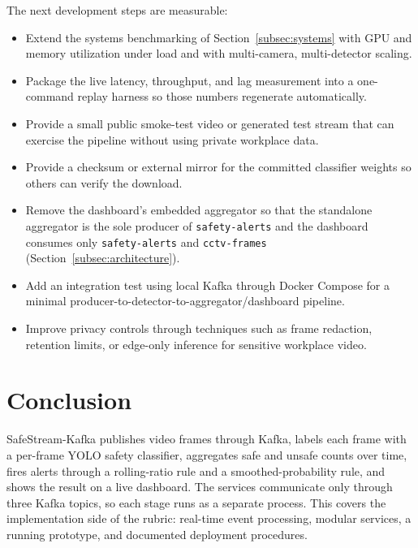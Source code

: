 \documentclass[conference]{IEEEtran}
\begin{document}
The next development steps are measurable:

\begin{itemize}
    \item Extend the systems benchmarking of Section~\ref{subsec:systems} with
    GPU and memory utilization under load and with multi-camera, multi-detector
    scaling.

    \item Package the live latency, throughput, and lag measurement into a
    one-command replay harness so those numbers regenerate automatically.

    \item Provide a small public smoke-test video or generated test
    stream that can exercise the pipeline without using private
    workplace data.

    \item Provide a checksum or external mirror for the committed classifier
    weights so others can verify the download.

    \item Remove the dashboard's embedded aggregator so that the standalone
    aggregator is the sole producer of \texttt{safety-alerts} and the dashboard
    consumes only \texttt{safety-alerts} and \texttt{cctv-frames}
    (Section~\ref{subsec:architecture}).

    \item Add an integration test using local Kafka through Docker
    Compose for a minimal producer-to-detector-to-aggregator/dashboard
    pipeline.

    \item Improve privacy controls through techniques such as frame
    redaction, retention limits, or edge-only inference for sensitive
    workplace video.
\end{itemize}


\section{Conclusion}

SafeStream-Kafka publishes video frames through Kafka, labels each frame
with a per-frame YOLO safety classifier, aggregates safe and unsafe counts
over time, fires alerts through a rolling-ratio rule and a
smoothed-probability rule, and shows the result on a live dashboard. The
services communicate only through three Kafka topics, so each stage runs
as a separate process. This covers the implementation side of the rubric:
real-time event processing, modular services, a running prototype, and
documented deployment procedures.
\end{document}
